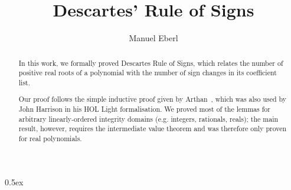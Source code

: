 \documentclass[11pt,a4paper]{article}
\begin{document}
\title{Descartes' Rule of Signs}
\author{Manuel Eberl}
\maketitle

\begin{abstract}
In this work, we formally proved Descartes Rule of Signs, which relates the number of positive real roots of a polynomial with the number of sign changes in its coefficient list.

Our proof follows the simple inductive proof given by Arthan~\cite{arthan}, which was also used by John Harrison in his HOL Light formalisation. We proved most of the lemmas for arbitrary linearly-ordered integrity domains (e.g. integers, rationals, reals); the main result, however, requires the intermediate value theorem and was therefore only proven for real polynomials.
\end{abstract}

\tableofcontents

\parindent 0pt\parskip 0.5ex





\end{document}
